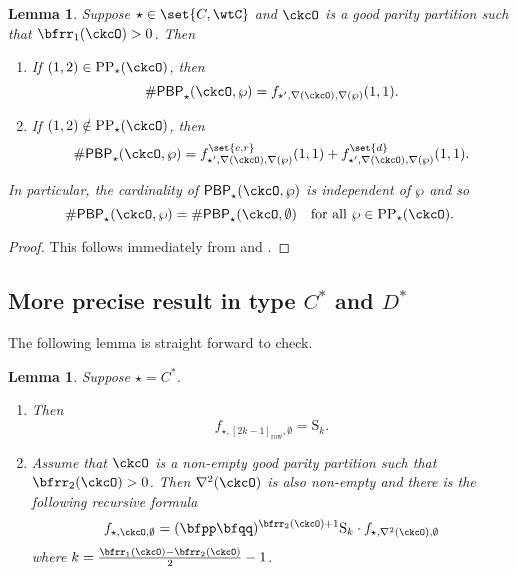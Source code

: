 \documentclass[12pt,a4paper]{amsart}
\newcommand{\CO}{{\mathcal {O}}}
\newcommand{\RS}{{\mathrm {S}}}
\def\DD{\nabla}
\numberwithin{equation}{section}
\newtheorem{lem}[thm]{Lemma}
\theoremstyle{remark}
\def\DD{\nabla}
\def\CPPs{\mathrm{PP}_{\star}}
\def\PBP{\mathsf{PBP}}
\def\PBPop#1#2#3#4{\PBP_{#1}^{#2}(#3,#4)}
\newcommand{\PBPOP}[1][]{\PBPop{\star}{#1}{\ckcO}{\wp}}
\def\yrow#1{\left[#1\right]_{\mathrm{row}}}
\def\DD{\nabla}
\begin{document}
\begin{lem}\label{lem:gf.C}
  Suppose $\star\in\set{C,\wtC}$ and $\ckcO$ is a good parity partition such that $\bfrr_{1}(\ckcO)>0$.
  Then %
  \begin{enumerate}[label=(\alph*)]
    \item If $(1,2)\in \CPPs(\ckcO)$, then
    \[
      \# \PBPOP =  f_{\star',\DD(\ckcO), \DD(\wp)}(1,1).
    \]
    \item If $(1,2)\notin \CPPs(\ckcO)$,
    then
    \[
      \# \PBPOP = f_{\star',\DD(\ckcO), \DD(\wp)}^{\set{c,r}}(1,1) + f_{\star',\DD(\ckcO), \DD(\wp)}^{\set{d}}(1,1).
    \]
  \end{enumerate}
  In particular, the cardinality of $\PBPOP$ is independent of $\wp$ and so
  \[
    \# \PBPOP = \# \PBPop{\star}{}{\ckcO}{\emptyset} \quad \text{for all $\wp\in \CPPs(\ckcO)$.}
  \]
\end{lem}
\begin{proof}
  This follows immediately from  and .
\end{proof}


\subsection{More precise result in type $C^{*}$ and $D^{*}$}
The following lemma is straight forward  to check.
\begin{lem}\label{lem:gf.C*}
  Suppose $\star = C^{*}$.
  \begin{enumerate}[label=(\alph*)]
    \item Then %
          \[
          f_{\star, \yrow{2k-1},\emptyset} = \RS_{k}.
          \]
    \item Assume that $\ckcO$ is a non-empty good parity partition such that
          $\bfrr_{2}(\ckcO)>0$. Then $\DD^{2}(\ckcO)$ is also non-empty and there is
          the following recursive formula
          \[
          f_{\star,\ckcO,\emptyset} = (\bfpp\bfqq)^{\bfrr_{2}(\ckcO)+1} \RS_{k}\cdot f_{\star,\DD^{2}(\ckcO),\emptyset}
          \]
          where $k = \frac{\bfrr_{1}(\ckcO)-\bfrr_{2}(\ckcO)}{2}-1$.
  \end{enumerate}
\end{lem}
\end{document}
